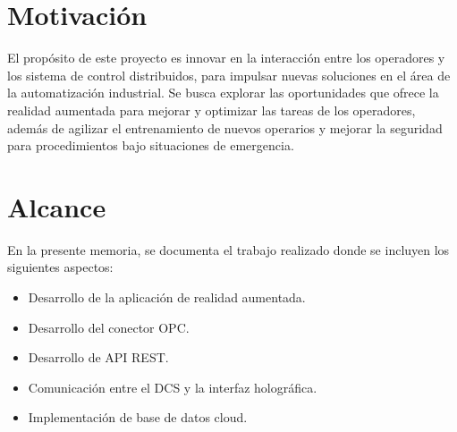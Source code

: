 \section{Motivación}
El propósito de este proyecto es innovar en la interacción entre los operadores y los sistema de control distribuidos, para impulsar nuevas soluciones en el área de la automatización industrial. Se busca explorar las oportunidades que ofrece la realidad aumentada para mejorar y optimizar las tareas de los operadores, además de agilizar el entrenamiento de nuevos operarios y mejorar la seguridad para procedimientos bajo situaciones de emergencia.


\section{Alcance}

En la presente memoria, se documenta el trabajo realizado donde se incluyen los siguientes aspectos:

\begin{itemize}	
\item Desarrollo de la aplicación de realidad aumentada.
\item Desarrollo del conector OPC.
\item Desarrollo de API REST.
\item Comunicación entre el DCS y la interfaz holográfica.
\item Implementación de base de datos cloud.
\end{itemize}